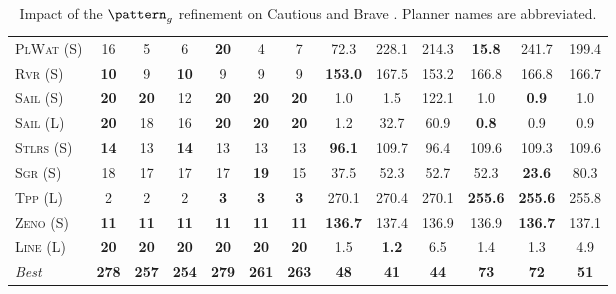 \documentclass[11pt,landscape]{article}
\begin{document}
\begin{table}[tb]
{\begin{tabular}{|l||cccccc||cccccc||}
\textsc{PlWat} (S)&16&5&6&\textbf{20}&4&7&72.3&228.1&214.3&\textbf{15.8}&241.7&199.4\\
\textsc{Rvr} (S)&\textbf{10}&9&\textbf{10}&9&9&9&\textbf{153.0}&167.5&153.2&166.8&166.8&166.7\\
\textsc{Sail} (S)&\textbf{20}&\textbf{20}&12&\textbf{20}&\textbf{20}&\textbf{20}&1.0&1.5&122.1&1.0&\textbf{0.9}&1.0\\
\textsc{Sail} (L)&\textbf{20}&18&16&\textbf{20}&\textbf{20}&\textbf{20}&1.2&32.7&60.9&\textbf{0.8}&0.9&0.9\\
\textsc{Stlrs} (S)&\textbf{14}&13&\textbf{14}&13&13&13&\textbf{96.1}&109.7&96.4&109.6&109.3&109.6\\
\textsc{Sgr} (S)&18&17&17&17&\textbf{19}&15&37.5&52.3&52.7&52.3&\textbf{23.6}&80.3\\
\textsc{Tpp} (L)&2&2&2&\textbf{3}&\textbf{3}&\textbf{3}&270.1&270.4&270.1&\textbf{255.6}&\textbf{255.6}&255.8\\
\textsc{Zeno} (S)&\textbf{11}&\textbf{11}&\textbf{11}&\textbf{11}&\textbf{11}&\textbf{11}&\textbf{136.7}&137.4&136.9&136.9&\textbf{136.7}&137.1\\
\textsc{Line} (L)&\textbf{20}&\textbf{20}&\textbf{20}&\textbf{20}&\textbf{20}&\textbf{20}&1.5&\textbf{1.2}&6.5&1.4&1.3&4.9
\\\hline
\textit{Best}&\textbf{278}&\textbf{257}&\textbf{254}&\textbf{279}&\textbf{261}&\textbf{263}&\textbf{48}&\textbf{41}&\textbf{44}&\textbf{73}&\textbf{72}&\textbf{51}\\\hline

        \end{tabular}}
        \caption{Impact of the $\pattern_g$ refinement on Cautious and Brave \pattyd. Planner names are abbreviated.}
        \label{tab:abl-patterng}
        \end{table}
        
\end{document}
